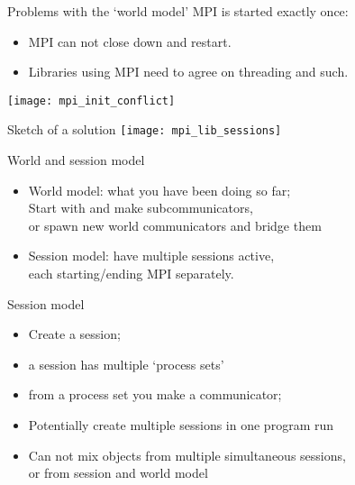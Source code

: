 
\begin{numberedframe}{Problems with the `world model'}
  MPI is started exactly once:
  \begin{itemize}
  \item MPI can not close down and restart.
  \item Libraries using MPI need to agree on threading and such.
  \end{itemize}
  \texttt{[image: mpi\_init\_conflict]}
\end{numberedframe}

\begin{numberedframe}{Sketch of a solution}
  \texttt{[image: mpi\_lib\_sessions]}  
\end{numberedframe}

\begin{numberedframe}{World and session model}
  \begin{itemize}
  \item World model: what you have been doing so far;\\
    Start with  and
    make subcommunicators, \\
    or spawn new world communicators and bridge them
  \item Session model: have multiple sessions active,\\
    each starting/ending MPI separately.
  \end{itemize}
\end{numberedframe}

\begin{numberedframe}{Session model}
  \begin{itemize}
  \item Create a session;
  \item a session has multiple `process sets'
  \item from a process set you make a communicator;
  \item Potentially create multiple sessions in one program run
  \item Can not mix objects from multiple simultaneous sessions,\\
    or from session and world model
  \end{itemize}
\end{numberedframe}

